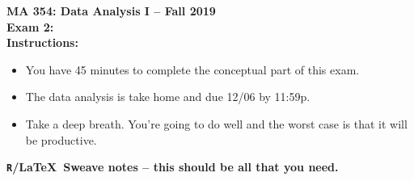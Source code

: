 \documentclass{article}
\begin{document}

\noindent \textbf{MA 354: Data Analysis I -- Fall 2019}\\%
\noindent \textbf{Exam 2:}\vspace{1em}\\
\textbf{Instructions:}
\begin{itemize}
	\item You have 45 minutes to complete the conceptual part of this exam.
	\item The data analysis is take home and due 12/06 by 11:59p.
	\item Take a deep breath. You're going to do well and the worst case is that it will be productive.
\end{itemize}
\textbf{\texttt{R}/\LaTeX ~Sweave notes -- this should be all that you need.}
\end{document}
